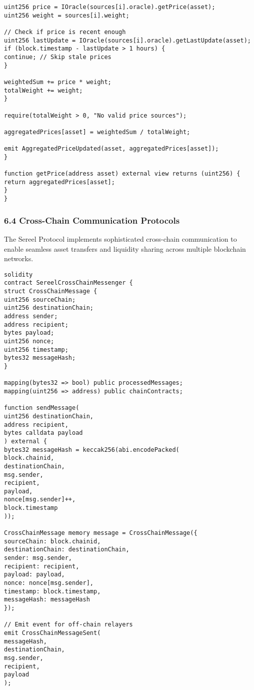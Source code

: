\documentclass[12pt]{article}
\begin{document}
{{{\begin{lstlisting}
uint256 price = IOracle(sources[i].oracle).getPrice(asset);
uint256 weight = sources[i].weight;

// Check if price is recent enough
uint256 lastUpdate = IOracle(sources[i].oracle).getLastUpdate(asset);
if (block.timestamp - lastUpdate > 1 hours) {
continue; // Skip stale prices
}

weightedSum += price * weight;
totalWeight += weight;
}

require(totalWeight > 0, "No valid price sources");

aggregatedPrices[asset] = weightedSum / totalWeight;

emit AggregatedPriceUpdated(asset, aggregatedPrices[asset]);
}

function getPrice(address asset) external view returns (uint256) {
return aggregatedPrices[asset];
}
}
\end{lstlisting}

\subsubsection{6.4 Cross-Chain Communication Protocols} %

The Sereel Protocol implements sophisticated cross-chain communication to enable seamless asset transfers and liquidity sharing across multiple blockchain networks.



\begin{lstlisting}
solidity
contract SereelCrossChainMessenger {
struct CrossChainMessage {
uint256 sourceChain;
uint256 destinationChain;
address sender;
address recipient;
bytes payload;
uint256 nonce;
uint256 timestamp;
bytes32 messageHash;
}

mapping(bytes32 => bool) public processedMessages;
mapping(uint256 => address) public chainContracts;

function sendMessage(
uint256 destinationChain,
address recipient,
bytes calldata payload
) external {
bytes32 messageHash = keccak256(abi.encodePacked(
block.chainid,
destinationChain,
msg.sender,
recipient,
payload,
nonce[msg.sender]++,
block.timestamp
));

CrossChainMessage memory message = CrossChainMessage({
sourceChain: block.chainid,
destinationChain: destinationChain,
sender: msg.sender,
recipient: recipient,
payload: payload,
nonce: nonce[msg.sender],
timestamp: block.timestamp,
messageHash: messageHash
});

// Emit event for off-chain relayers
emit CrossChainMessageSent(
messageHash,
destinationChain,
msg.sender,
recipient,
payload
);


\end{lstlisting}}}}
\end{document}
